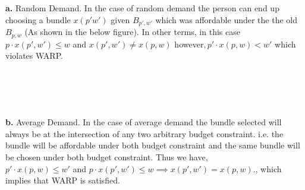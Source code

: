 \documentclass[12pt]{article}
\newenvironment{problem}[2][Problem]{\begin{trivlist}
\item[\hskip \labelsep {\bfseries #1}\hskip \labelsep {\bfseries #2.}]}{\end{trivlist}}
\begin{document}
\begin{problem}{3}. \\ \\ 
\textbf{a.} Random Demand. In the case of random demand the person can end up choosing a bundle $x(p'w') $ given $B_{p',w'} $ which was affordable under the the old $ B_{p,w} $ (As shown in the below figure). In other terms, in this case $ p\cdot x(p',w') \leq w $ and $x(p',w') \neq x(p,w) $ however$,  p' \cdot x(p,w) < w'$ which violates WARP. 
\\
\\
\\
\\
\\
\textbf{b.} Average Demand. In the case of average demand the bundle selected will always be at the intersection of any two arbitrary budget constraint. i.e. the bundle will be affordable under both budget constraint and the same bundle will be chosen under both budget constraint. Thus we have,
\\
$p'  \cdot x(p, w) \leq w' $ and $ p \cdot x(p', w') \leq w \implies x(p',w') = x(p,w). $, which implies that WARP is satisfied. 
\\
\\
\end{problem}
\end{document}
